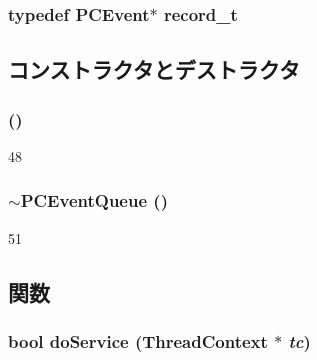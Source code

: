 \label{classPCEventQueue_a25395d8f6c965039772100efce59edcb}
\hypertarget{classPCEventQueue_a0d238315b10c4db15cb81a537feeb907}{
\subsubsection[{record\_\-t}]{\setlength{\rightskip}{0pt plus 5cm}typedef {\bf PCEvent}$\ast$ {\bf record\_\-t}}}
\label{classPCEventQueue_a0d238315b10c4db15cb81a537feeb907}


\subsection{コンストラクタとデストラクタ}
\hypertarget{classPCEventQueue_a718316a2d788aa19b6fc2bedf8213e23}{
\subsubsection[{PCEventQueue}]{ ()}}
\label{classPCEventQueue_a718316a2d788aa19b6fc2bedf8213e23}



\begin{DoxyCode}
48 {}
\end{DoxyCode}
\hypertarget{classPCEventQueue_aafeb23d2ec00e98724e77957cea69320}{
\subsubsection[{$\sim$PCEventQueue}]{\setlength{\rightskip}{0pt plus 5cm}$\sim${\bf PCEventQueue} ()}}
\label{classPCEventQueue_aafeb23d2ec00e98724e77957cea69320}



\begin{DoxyCode}
51 {}
\end{DoxyCode}


\subsection{関数}
\hypertarget{classPCEventQueue_a52d7ad71fc18d1ed1be0caccabfacf6a}{
\subsubsection[{doService}]{\setlength{\rightskip}{0pt plus 5cm}bool doService ({\bf ThreadContext} $\ast$ {\em tc})}}
\label{classPCEventQueue_a52d7ad71fc18d1ed1be0caccabfacf6a}



